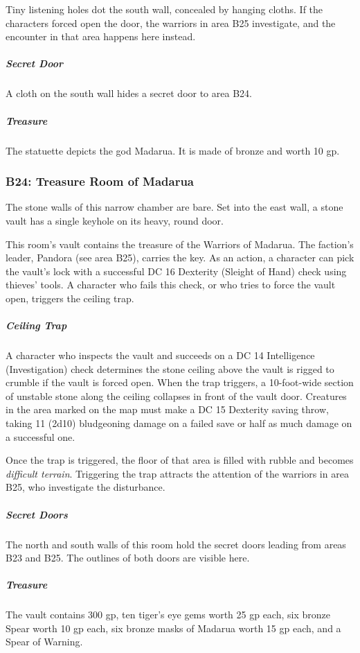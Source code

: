 \documentclass[10pt,a4paper,twoside,bg=print,twocolumn,openany,nodeprecatedcode]{dndbook}
\begin{document}
Tiny listening holes dot the south wall, concealed by hanging cloths. If the characters forced open the door, the warriors in area B25 investigate, and the encounter in that area happens here instead.

\subparagraph{Secret Door}
A cloth on the south wall hides a secret door to area B24.

\subparagraph{Treasure}
The statuette depicts the god Madarua. It is made of bronze and worth 10 gp.

\subsubsection{B24: Treasure Room of Madarua}
\begin{DndReadAloud}{}
The stone walls of this narrow chamber are bare. Set into the east wall, a stone vault has a single keyhole on its heavy, round door.

\end{DndReadAloud}

This room's vault contains the treasure of the Warriors of Madarua. The faction's leader, Pandora (see area B25), carries the key. As an action, a character can pick the vault's lock with a successful DC 16 Dexterity (Sleight of Hand) check using thieves' tools. A character who fails this check, or who tries to force the vault open, triggers the ceiling trap.

\subparagraph{Ceiling Trap}
A character who inspects the vault and succeeds on a DC 14 Intelligence (Investigation) check determines the stone ceiling above the vault is rigged to crumble if the vault is forced open. When the trap triggers, a 10-foot-wide section of unstable stone along the ceiling collapses in front of the vault door. Creatures in the area marked on the map must make a DC 15 Dexterity saving throw, taking 11 (2d10) bludgeoning damage on a failed save or half as much damage on a successful one.

Once the trap is triggered, the floor of that area is filled with rubble and becomes \textit{difficult terrain}. Triggering the trap attracts the attention of the warriors in area B25, who investigate the disturbance.

\subparagraph{Secret Doors}
The north and south walls of this room hold the secret doors leading from areas B23 and B25. The outlines of both doors are visible here.

\subparagraph{Treasure}
The vault contains 300 gp, ten tiger's eye gems worth 25 gp each, six bronze Spear worth 10 gp each, six bronze masks of Madarua worth 15 gp each, and a Spear of Warning.
\end{document}
